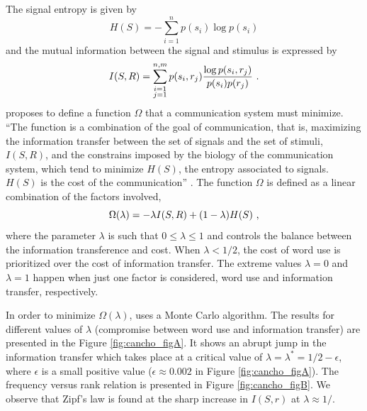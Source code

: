 The signal entropy is given by
\begin{equation}
H(S) = - \sum_{i=1}^{n} p(s_i) \log p(s_i)
\end{equation}
and the mutual information between the signal and stimulus is expressed by
\begin{equation}
I(S,R) = \sum_{\substack{i=1\\ j=1}}^{n,m} p(s_i, r_j) \frac{\log p(s_i, r_j)}{p(s_i) p(r_j)} \textmd{ .}
\end{equation}
\cite{cancho2005} proposes to define a function $\Omega$ that a communication system must
minimize. ``The function is a combination of the goal of communication, that is, maximizing the 
information transfer between the set of signals and the set of stimuli, $I(S, R)$, and the constrains 
imposed by the biology of the communication system, which tend to minimize $H(S)$, the entropy associated 
to signals. $H(S)$ is the cost of the communication'' \citep{cancho2005}. The function $\Omega$ is
defined as a linear combination of the factors involved,
\begin{equation}
\Omega(\lambda) = - \lambda I(S,R) + (1-\lambda) H(S) \textmd{ ,}
\end{equation}
where the parameter $\lambda$ is such that $0 \leq \lambda \leq 1$ and controls the balance between 
the information transference and cost. When $\lambda < 1/2$, the cost of word use is prioritized over
the cost of information transfer. The extreme values $\lambda = 0$ and $\lambda = 1$ happen when just 
one factor is considered, word use and information transfer, respectively.

In order to minimize $\Omega(\lambda)$, \cite{cancho2005} uses a Monte Carlo algorithm.
The results for different values of $\lambda$ (compromise between word use and information transfer) 
are presented in the Figure \ref{fig:cancho_figA}. It shows an abrupt jump in the information transfer
which takes place at a critical value of $\lambda = \lambda^\ast = 1/2 - \epsilon$, where $\epsilon$
is a small positive value ($\epsilon \approx 0.002$ in Figure \ref{fig:cancho_figA}). The frequency versus rank
relation is presented in Figure \ref{fig:cancho_figB}. We observe that Zipf's law is found at the sharp increase in
$I(S,r)$ at $\lambda \approx 1/$.


